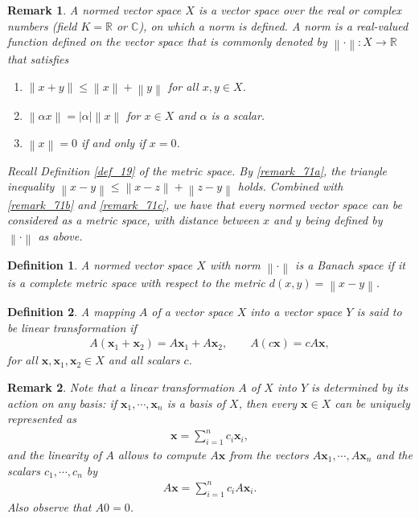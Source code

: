 \documentclass[11pt]{book}
\newtheorem{definition}{Definition}[chapter]
\newtheorem{remark}{Remark}[chapter]
\theoremstyle{definition}
\numberwithin{equation}{chapter}
\begin{document}
\begin{remark}
A normed vector space $X$ is a vector space over the real or complex numbers (field $K = \mathbb{R}$ or $\mathbb{C}$), on which a norm is defined. A norm is a real-valued function defined on the vector space that is commonly denoted by $\left\|\cdot\right\|: X \to \mathbb{R}$ that satisfies
\begin{enumerate}[label=(\roman*)]
    \item $\left\|x + y\right\| \leq \left\|x\right\| + \left\|y\right\|$ for all $x,y \in X$. \label{remark_71a} 
    
    \item $\left\|\alpha x\right\| = \left|\alpha\right| \left\|x\right\|$ for $x \in X$ and $\alpha$ is a scalar. \label{remark_71b}
    
    \item $\left\|x\right\| = 0$ if and only if $x = 0$. \label{remark_71c}
\end{enumerate}

Recall Definition \ref{def_19} of the metric space. By \ref{remark_71a}, the triangle inequality $\left\|x - y\right\| \leq \left\|x - z\right\| + \left\|z - y\right\|$ holds. Combined with \ref{remark_71b} and \ref{remark_71c}, we have that every normed vector space can be considered as a metric space, with distance between $x$ and $y$ being defined by $\left\|\cdot\right\|$ as above.
\end{remark}

\medskip

\begin{definition}
A normed vector space $X$ with norm $\left\|\cdot\right\|$ is a Banach space if it is a complete metric space with respect to the metric $d(x,y) = \left\|x - y\right\|$.
\end{definition}

\medskip

\begin{definition}
A mapping $A$ of a vector space $X$ into a vector space $Y$ is said to be linear transformation if 
\begin{align*}
    A(\mathbf{x}_1 + \mathbf{x}_2) = A \mathbf{x}_1 + A \mathbf{x}_2, \qquad A(c\mathbf{x}) = c A \mathbf{x},
\end{align*}
for all $\mathbf{x}, \mathbf{x}_1, \mathbf{x}_2 \in X$ and all scalars $c$. 
\end{definition}

\begin{remark}
Note that a linear transformation $A$ of $X$ into $Y$ is determined by its action on any basis: if $\mathbf{x}_1, \cdots, \mathbf{x}_n$ is a basis of $X$, then every $\mathbf{x} \in X$ can be uniquely represented as 
\begin{align*}
    \mathbf{x} = \sum^n_{i=1} c_i \mathbf{x}_i,
\end{align*}
and the linearity of $A$ allows to compute $A\mathbf{x}$ from the vectors $A\mathbf{x}_1, \cdots, A\mathbf{x}_n$ and the scalars $c_1, \cdots, c_n$ by
\begin{align*}
    A\mathbf{x} = \sum^n_{i=1} c_i A \mathbf{x}_i.
\end{align*}
Also observe that $A0 = 0$.
\end{remark}
\end{document}
